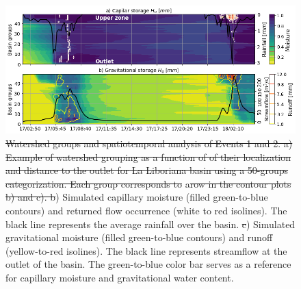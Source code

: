 \documentclass[hess, manuscript]{copernicus}
\providecommand{\DIFadd}[1]{{\protect\color{blue}\uwave{#1}}} %
\providecommand{\DIFdel}[1]{{\protect\color{red}\sout{#1}}}                      %
\providecommand{\DIFaddFL}[1]{\DIFadd{#1}} %
\providecommand{\DIFdelFL}[1]{\DIFdel{#1}} %
\providecommand{\DIFaddbeginFL}{} %
\providecommand{\DIFaddendFL}{} %
\providecommand{\DIFdelbeginFL}{} %
\providecommand{\DIFdelendFL}{} %
\begin{document}
\begin{figure}[t!]
\centering
 \DIFdelbeginFL %
\DIFdelendFL \DIFaddbeginFL \includegraphics[width=14cm]{Figures/Evolucion_humedad.png}
 \DIFaddendFL \caption{\DIFdelbeginFL \DIFdelFL{Watershed groups and spatiotemporal analysis of Events 1 and 2.  a) Example of watershed grouping as a function of of their localization and distance to the outlet for La Liboriana basin using a 50-groups categorization. Each group corresponds to }\DIFdelendFL  a\DIFdelbeginFL \DIFdelFL{row in the contour plots b) and c). b}\DIFdelendFL ) Simulated capillary moisture (filled green-to-blue contours) and returned flow occurrence (white to red isolines).  The black line represents the average rainfall over the basin. \DIFdelbeginFL \DIFdelFL{c}\DIFdelendFL \DIFaddbeginFL \DIFaddFL{b}\DIFaddendFL ) Simulated gravitational moisture (filled green-to-blue contours) and runoff (yellow-to-red isolines).  The black line represents streamflow at the outlet of the basin.  The green-to-blue color bar serves as a reference for capillary moisture and gravitational water content.}
    \label{fig:HumedadSpatioTemporal}
\end{figure}
\end{document}
